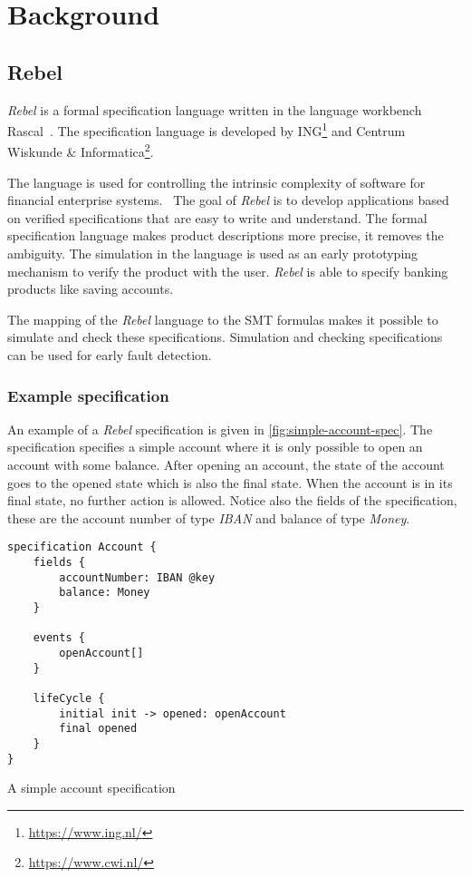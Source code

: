 \chapter{Background}


\section{Rebel}

\textit{Rebel} is a formal specification language written in the language workbench Rascal~\cite{RascalGTTSE}. The specification language is developed by ING\footnote{\url{https://www.ing.nl/}} and Centrum Wiskunde \& Informatica\footnote{\url{https://www.cwi.nl/}}.

The language is used for controlling the intrinsic complexity of software for financial enterprise systems.~\cite[p.~1]{stoel_storm_vinju_bosman_2016} The goal of \textit{Rebel} is to develop applications based on verified specifications that are easy to write and understand.
The formal specification language makes product descriptions more precise, it removes the ambiguity. The simulation in the language is used as an early prototyping mechanism to verify the product with the user.
\textit{Rebel} is able to specify banking products like saving accounts.

The mapping of the \textit{Rebel} language to the SMT formulas makes it possible to simulate and check these specifications. Simulation and checking specifications can be used for early fault detection.

\subsection{Example specification}
An example of a \textit{Rebel} specification is given in \autoref{fig:simple-account-spec}. The specification specifies a simple account where it is only possible to open an account with some balance. After opening an account, the state of the account goes to the opened state which is also the final state. When the account is in its final state, no further action is allowed. Notice also the fields of the specification, these are the account number of type \textit{IBAN} and balance of type \textit{Money}.

\begin{sourcecode}[h!]
\begin{lstlisting}[]
specification Account {
	fields {
		accountNumber: IBAN @key
		balance: Money
	}

	events {
		openAccount[]
	}

	lifeCycle {
		initial init -> opened: openAccount
		final opened
	}
}
\end{lstlisting}
\caption{A simple account specification}\label{fig:simple-account-spec}
\end{sourcecode}
\FloatBarrier

